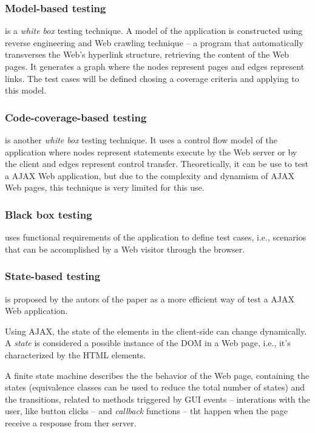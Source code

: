\documentclass[a4paper]{article}
\begin{document}
\subsubsection{Model-based testing}

is a \emph{white box} testing technique.
A model of the application is constructed using reverse engineering and Web crawling technique -- a program that automatically transverses the Web's hyperlink structure, retrieving the content of the Web pages.
It generates a graph where the nodes represent pages and edges represent links.
The test cases will be defined chosing a coverage criteria and applying to this model. 

\subsubsection{Code-coverage-based testing} 

is another \emph{white box} testing technique. 
It uses a control flow model of the application where nodes represent statements execute by the Web server or by the client and edges represent control transfer.
Theoretically, it can be use to test a AJAX Web application, but due to the complexity and dynamism of AJAX Web pages, this technique is very limited for this use.

\subsubsection{Black box testing} 

uses functional requirements of the application to define test cases, i.e., scenarios that can be accomplished by a Web visitor through the browser.

\subsubsection{State-based testing}

is proposed by the autors of the paper as a more efficient way of test a AJAX Web application.

Using AJAX, the state of the elements in the client-side can change dynamically.
A \emph{state} is considered a possible instance of the DOM in a Web page, i.e., it's characterized by the HTML elements.

A finite state machine describes the the behavior of the Web page, containing the states (equivalence classes can be used to reduce the total number of states) and the transitions, related to methods triggered by GUI events -- interations with the user, like button clicks -- and \emph{callback} functions -- tht happen when the page receive a response from ther server.
\end{document}
